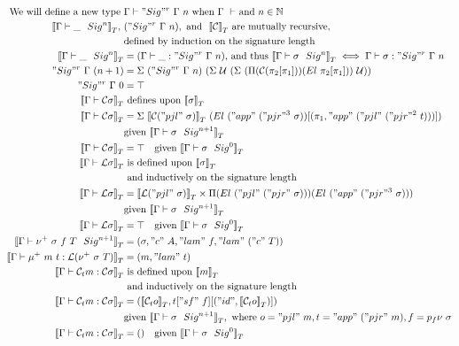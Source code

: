 \begin{align*}
  \text{We will define a new type }& \goodType{\Gamma}{\Sigr{\Gamma}{n}}{} \text{ when } \goodCtx{\Gamma}{} \text{ and } n \in \mathbb{N} \\
  \denotesT{\goodSig{\Gamma}{\_}{n}},\ &({\Sigr{\Gamma}{n}}), \text{ and } \ \denotesT{\cC} \text{ are mutually recursive, } \\
  & \text{defined by induction on the signature length} \\  
  \denotesT{\goodSig{\Gamma}{\_}{n}} &= (\goodTerm{\Gamma}{\_}{\Sigr{\Gamma}{n}}) \text{, and thus } \denotesT{\goodSig{\Gamma}{\sigma}{n}} \iff \goodTerm{\Gamma}{\sigma}{\Sigr{\Gamma}{n}} \\ 
  {\Sigr{\Gamma}{(n+1)}} &= 
    \Sigma~(\Sigr{\Gamma}{n})
          ~(\Sigma~\cU
                  ~(\Sigma~(\Pi(\cC (\pi_2[\pi_1]))(El~\pi_2[\pi_1]))~\cU)) \\
  \Sigr{\Gamma}{0} &= \top \\
  \denotesT{\goodType{\Gamma}{\cC \sigma}{}} &\text{ defines upon } \denotesT{\sigma} \\
  \denotesT{\goodType{\Gamma}{\cC \sigma}{}} &= 
    \Sigma~\denotesT{\cC ("pjl"~\sigma)}~(El \ ("app"~("pjr"^3~\sigma))[(\pi_1, "app"~("pjl"~("pjr"^2~t)))]) \\
      &\text{given } \denotesT{\goodSig{\Gamma}{\sigma}{n+1}} \\
  \denotesT{\goodType{\Gamma}{\cC \sigma}{}} &= \top \quad
      \text{given } \denotesT{\goodSig{\Gamma}{\sigma}{0}} \\ 
  \denotesT{\goodType{\Gamma}{\cL\sigma}{}} & \text{ is defined upon } \denotesT{\sigma} \\
  & \text{ and inductively on the signature length} \\ 
  \denotesT{\goodType{\Gamma}{\cL\sigma}{}} &=
  \denotesT{\cL("pjl"~\sigma)} \times \Pi(El~("pjl"~("pjr"~\sigma)))(El~("app"~("pjr"^3~\sigma))) \\
  &\text{given } \denotesT{\goodSig{\Gamma}{\sigma}{n+1}} \\
  \denotesT{\goodType{\Gamma}{\cL\sigma}{}} &= \top \quad \text{given } \denotesT{\goodSig{\Gamma}{\sigma}{0}} \\
  \denotesT{\goodSig{\Gamma}{\nu^+~\sigma~f~T}{n+1}} &= (\sigma, "c"~A, "lam"~f, "lam"~("c"~T)) \\ 
  \denotesT{\goodTerm{\Gamma}{\mu^+~m~t}{\cL(\nu^+~\sigma~T)}} &= (m, "lam"~t) \\ 
  \denotesT{\goodTerm{\Gamma}{\cCt m}{\cC\sigma}} & \text{ is defined upon } \denotesT{m}\\
  & \text{ and inductively on the signature length} \\ 
  \denotesT{\goodTerm{\Gamma}{\cCt m}{\cC\sigma}} &= 
  (\denotesT{\cCt o}, t["sf"~f][("id", \denotesT{\cCt o})]) \\
  & \text{given } \denotesT{\goodSig{\Gamma}{\sigma}{n+1}}, \text{ where } o = "pjl"~m, t = "app"~("pjr"~m), f = p_f\nu~\sigma \\ 
  \denotesT{\goodTerm{\Gamma}{\cCt m}{\cC \sigma}} &= () \quad \text{given } \denotesT{\goodSig{\Gamma}{\sigma}{0}}
\end{align*}
